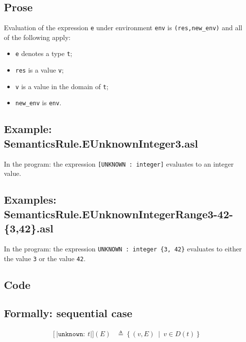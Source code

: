 \documentclass{book}
\newcommand\syntt[1]{\mathtt{#1}}
\newcommand\llbracket{[|}
\newcommand\rrbracket{|]}
\newcommand\interp[1]{\left\llbracket #1 \right\rrbracket}
\newcommand\st[0]{\ \middle|\ }
\begin{document}
  \subsection{Prose}
  Evaluation of the expression \texttt{e} under environment \texttt{env} is
  \texttt{(res,new\_env)} and all of the following apply:
  \begin{itemize}
  \item \texttt{e} denotes a type \texttt{t};
  \item \texttt{res} is a value \texttt{v};
  \item \texttt{v} is a value in the domain of \texttt{t};
  \item \texttt{new\_env} is \texttt{env}.
  \end{itemize}

  \subsection{Example: SemanticsRule.EUnknownInteger3.asl}
    In the program:
    the expression \texttt{[UNKNOWN : integer]} evaluates to an integer value.

  \subsection{Examples: SemanticsRule.EUnknownIntegerRange3-42-\{3,42\}.asl}

    In the program:
    the expression \texttt{UNKNOWN : integer \{3, 42\}} evaluates to either the value
\texttt{3} or the value \texttt{42}.

  \subsection{Code}

  \subsection{Formally: sequential case}

  \begin{align}  
  \interp{\syntt{unknown:}\ t} (E) & \triangleq \left\{ (v, E) \st{} v \in{} D(t) \right\}
  \label{eq:sem-seq-unknown}  
  \end{align}  
\end{document}
